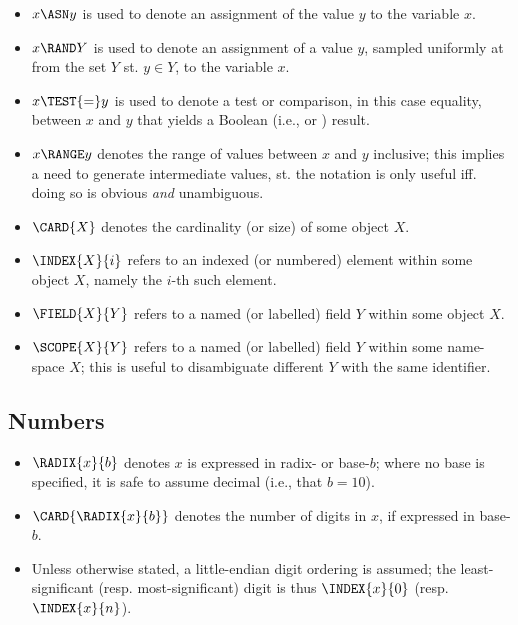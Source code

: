 \begin{itemize}

\item $x \ASN     y$
      is used to denote an assignment of the value $y$
      to the variable $x$.
\item $x \RAND    Y$
      is used to denote an assignment of a   value $y$,
      sampled uniformly at from the set $Y$ st. $y \in Y$,
      to the variable $x$.
\item $x \TEST{=} y$
      is used to denote a  test or comparison,
      in this case equality,
      between $x$ and $y$ that yields a Boolean (i.e., \TRUE or \FALSE) result.
\item $x \RANGE   y$
      denotes the range of values between $x$ and $y$ inclusive; this implies
      a need to generate intermediate values, st. the notation is only useful
      iff. doing so is obvious {\em and} unambiguous.

\item  $\CARD{X}$
      denotes the cardinality (or size) of some object $X$.
\item $\INDEX{X}{i}$
      refers to an indexed (or numbered)
      element   within some object     $X$, namely the $i$-th such element.
\item $\FIELD{X}{Y}$
      refers to a  named (or labelled)
      field $Y$ within some object     $X$.
\item $\SCOPE{X}{Y}$
      refers to a  named (or labelled)
      field $Y$ within some name-space $X$;
      this is useful to disambiguate different $Y$ with the same identifier.

\end{itemize}


\subsection{Numbers}

\begin{itemize}

\item $\RADIX{x}{b}$ denotes $x$ is expressed in radix- or base-$b$; where no
      base is specified, it is safe to assume decimal (i.e., that $b = 10$).
\item $\CARD{\RADIX{x}{b}}$ denotes the number of digits in $x$, if expressed
      in base-$b$.
\item Unless otherwise stated, a little-endian digit ordering is assumed; the
      least-significant (resp. most-significant) digit is thus $\INDEX{x}{0}$
      (resp. $\INDEX{x}{n}$).

\end{itemize}

